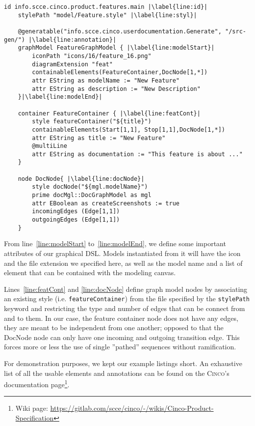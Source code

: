 \begin{lstlisting}[language=MGL, caption={Excerpt from the feature.mgl, meta-specification of the graph model}, label=docMGL, escapechar=|, name=DocMGL]
    id info.scce.cinco.product.features.main |\label{line:id}|
    stylePath "model/Feature.style" |\label{line:styl}|

    @generatable("info.scce.cinco.userdocumentation.Generate", "/src-gen/") |\label{line:annotation}|
    graphModel FeatureGraphModel { |\label{line:modelStart}|
        iconPath "icons/16/feature_16.png"
        diagramExtension "feat"
        containableElements(FeatureContainer,DocNode[1,*])
        attr EString as modelName := "New Feature"
        attr EString as description := "New Description"
    }|\label{line:modelEnd}|
    
    container FeatureContainer { |\label{line:featCont}|
        style featureContainer("${title}")
        containableElements(Start[1,1], Stop[1,1],DocNode[1,*])
        attr EString as title := "New Feature"
        @multiLine
        attr EString as documentation := "This feature is about ..."
    }
    
    node DocNode{ |\label{line:docNode}|
        style docNode("${mgl.modelName}")
        prime docMgl::DocGraphModel as mgl
        attr EBoolean as createScreenshots := true
        incomingEdges (Edge[1,1])
        outgoingEdges (Edge[1,1])
    }
\end{lstlisting}

From line~\ref{line:modelStart} to~\ref{line:modelEnd}, we define some important attributes of our graphical DSL. Models instantiated from it will have the icon and the file extension we specified here, as well as the model name and a list of element that can be contained with the modeling canvas.


Lines~\ref{line:featCont} and \ref{line:docNode} define graph model nodes by associating an existing style (i.e. \lstinline{featureContainer}) from the file specified by the \lstinline[language=MGL]{stylePath} keyword and restricting the type and number of edges that can be connect from and to them. In our case, the feature container node does not have any edges, they are meant to be independent from one another; opposed to that the DocNode node can only have one incoming and outgoing transition edge. This forces more or less the use of single ''pathed'' sequences without ramification.

For demonstration purposes, we kept our example listings short. An exhaustive list of all the usable elements and annotations can be found on the \textsc{Cinco}'s documentation page\footnote[1]{Wiki page: \url{https://gitlab.com/scce/cinco/-/wikis/Cinco-Product-Specification}}.

